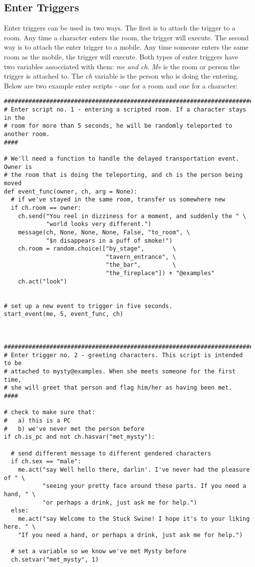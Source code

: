 \documentclass[12pt]{article}
\begin{document}
\subsection{Enter Triggers}
Enter triggers can be used in two ways. The first is to attach the trigger to
a room. Any time a character enters the room, the trigger will execute. The second way is to attach the enter trigger to a mobile. Any time someone enters the same room as the mobile, the trigger will execute. Both types of enter triggers have two variables assocciated with them: {\it me and ch}. {\it Me} is the room or person the trigger is attached to. The {\it ch} variable is the person who is doing the entering. Below are two example enter scripts - one for a room and one for a character:

{\bf \begin{verbatim}
################################################################################
# Enter script no. 1 - entering a scripted room. If a character stays in the
# room for more than 5 seconds, he will be randomly teleported to another room.
####

# We'll need a function to handle the delayed transportation event. Owner is
# the room that is doing the teleporting, and ch is the person being moved
def event_func(owner, ch, arg = None):
  # if we've stayed in the same room, transfer us somewhere new
  if ch.room == owner:
    ch.send("You reel in dizziness for a moment, and suddenly the " \
            "world looks very different.")
    message(ch, None, None, None, False, "to_room", \
            "$n disappears in a puff of smoke!")
    ch.room = random.choice(["by_stage",        \
                             "tavern_entrance", \
                             "the_bar",         \ 
                             "the_fireplace"]) + "@examples"
    ch.act("look")


# set up a new event to trigger in five seconds.
start_event(me, 5, event_func, ch)



################################################################################
# Enter trigger no. 2 - greeting characters. This script is intended to be
# attached to mysty@examples. When she meets someone for the first time,
# she will greet that person and flag him/her as having been met.
####

# check to make sure that:
#   a) this is a PC
#   b) we've never met the person before
if ch.is_pc and not ch.hasvar("met_mysty"):

  # send different message to different gendered characters
  if ch.sex == "male":
    me.act("say Well hello there, darlin'. I've never had the pleasure of " \
           "seeing your pretty face around these parts. If you need a hand, " \
           "or perhaps a drink, just ask me for help.")
  else:
    me.act("say Welcome to the Stuck Swine! I hope it's to your liking here. " \
    "If you need a hand, or perhaps a drink, just ask me for help.")
  
  # set a variable so we know we've met Mysty before
  ch.setvar("met_mysty", 1)
\end{verbatim}}
\end{document}
